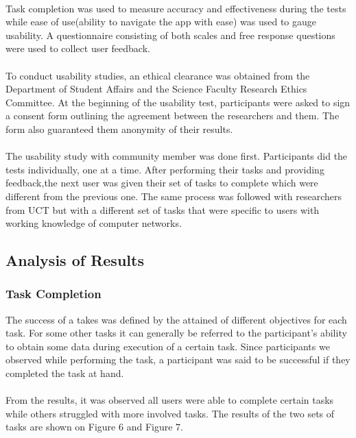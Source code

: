 \paragraph{}
Task completion was used to measure accuracy and effectiveness during the tests while ease of use(ability to navigate the app with ease) was used to gauge usability. A questionnaire consisting of both scales and free response questions were used to collect user feedback.
\paragraph{}
To conduct usability studies, an ethical clearance was obtained from the Department of Student Affairs and the Science Faculty Research Ethics Committee. At the beginning of the usability test, participants were asked to sign a consent form outlining the agreement between the researchers and them. The form also guaranteed them anonymity of their results.
\paragraph{}
The usability study with community member was done first. Participants did the tests individually, one at a time. After performing their tasks and providing feedback,the next user was given their set of tasks to complete which were different from the previous one. The same process was followed with researchers from UCT but with a different set of tasks that were specific to users with working knowledge of computer networks.
\subsection{Analysis of Results}
\subsubsection{Task Completion}
The success of a takes was defined by the attained of different objectives for each task. For some other tasks it can generally be referred to the participant's ability to obtain some data during execution of a certain task. Since participants we observed while performing the task, a participant was said to be successful if they completed the task at hand.
\paragraph{}
From the results, it was observed all users were able to complete certain tasks while others struggled with more involved tasks. The results of the  two sets of tasks are shown on Figure 6 and Figure 7.

